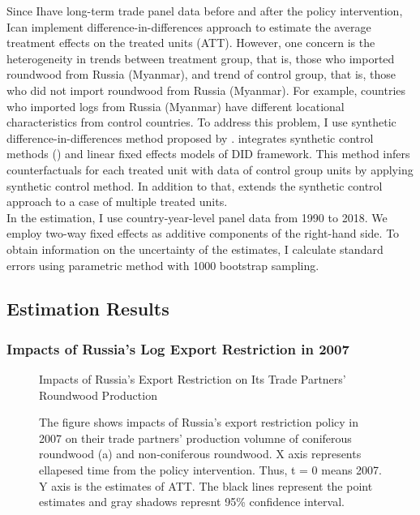 \documentclass[a4paper,12pt]{article}
\begin{document}
Since Ihave long-term trade panel data before and after the policy intervention, Ican implement difference-in-differences approach to estimate the average treatment effects on the treated units (ATT). However, one concern is the heterogeneity in trends between treatment group, that is, those who imported roundwood from Russia (Myanmar), and trend of control group, that is, those who did not import roundwood from Russia (Myanmar). For example, countries who imported logs from Russia (Myanmar) have different locational characteristics from control countries. To address this problem, I use synthetic difference-in-differences method proposed by \cite{xu2017generalized}. \cite{xu2017generalized} integrates synthetic control methods (\cite{abadie2010synthetic}) and linear fixed effects models of DID framework. This method infers counterfactuals for each treated unit with data of control group units by applying synthetic control method. In addition to that, \cite{xu2017generalized} extends the synthetic control approach to a case of multiple treated units.\\ 

In the estimation, I use country-year-level panel data from 1990 to 2018. We employ two-way fixed effects as additive components of the right-hand side. To obtain information on the uncertainty of the estimates, I calculate standard errors using parametric method with 1000 bootstrap sampling.

\subsection{Estimation Results}
\subsubsection*{Impacts of Russia's Log Export Restriction in 2007}

\begin{figure}[H] 
    \centering
    \caption{Impacts of Russia's Export Restriction on Its Trade Partners' Roundwood Production}
    \caption*{\small{The figure shows impacts of Russia's export restriction policy in 2007 on their trade partners' production volumne of coniferous roundwood (a) and non-coniferous roundwood. X axis represents ellapesed time from the policy intervention. Thus, t = 0 means 2007. Y axis is the estimates of ATT. The black lines represent the point estimates and gray shadows represnt 95\% confidence interval.}}
    \label{fig:att_prod_Russia}
\end{figure}
\end{document}
